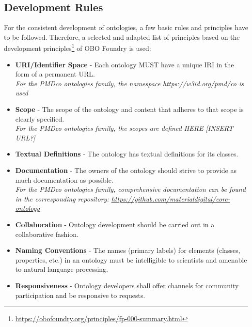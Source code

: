 
\subsection{Development Rules}
\label{ssec:development-rules}

For the consistent development of ontologies, a few basic rules and principles have to be followed.
Therefore, a selected and adapted list of principles based on the development principles\footnote{\url{https://obofoundry.org/principles/fp-000-summary.html}} of OBO Foundry\cite{smith2007obo} is used:

\begin{itemize}
    \item \textbf{URI/Identifier Space} - Each ontology MUST have a unique IRI in the form of a permanent URL. \\ \textit{For the PMDco ontologies family, the namespace https://w3id.org/pmd/co is used}
    \item \textbf{Scope} - The scope of the ontology and content that adheres to that scope is clearly specified. \\ \textit{For the PMDco ontologies family, the scopes are defined HERE [INSERT URL?]}
    \item \textbf{Textual Definitions} - The ontology has textual definitions for its classes.
    \item \textbf{Documentation} - The owners of the ontology should strive to provide as much documentation as possible. \\ \textit{For the PMDco ontologies family, comprehensive documentation can be found in the corresponding {\github}  repository: \url{https://github.com/materialdigital/core-ontology}}
    \item \textbf{Collaboration} - Ontology development should be carried out in a collaborative fashion.
    \item \textbf{Naming Conventions} - The names (primary labels) for elements (classes, properties, etc.) in an ontology must be intelligible to scientists and amenable to natural language processing.
    \item \textbf{Responsiveness} - Ontology developers shall offer channels for community participation and be responsive to requests.
\end{itemize}






